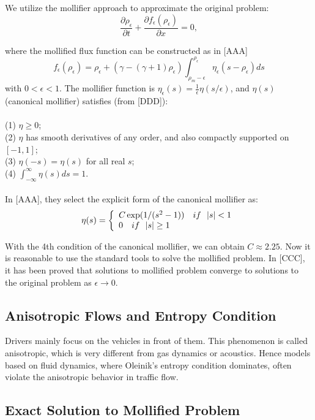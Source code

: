\documentclass[10pt]{article}
\newcommand{\e}{\epsilon}
\newcommand{\p}{\partial}
\begin{document}
We utilize the mollifier approach to approximate the original problem:
\[
\frac{\p \rho_\e}{\p t} + \frac{\p f_\e(\rho_\e)}{\p x} = 0,
\]

where the mollified flux function can be constructed as in [AAA]
\[
f_{\e}(\rho_{\e})=\rho_{\e}+(\gamma-(\gamma+1)\rho_{\e})\int_{\rho_m-\e}^{\rho_{\e}} \eta_\e(s-\rho_\e) ds
\]
with $0<\epsilon<1$. The mollifier function is $\eta_\e(s)=\frac{1}{\e}\eta(s/\e)$, and $\eta(s)$ (canonical mollifier) satisfies (from [DDD]):
\\\\
(1) $\eta\geq 0$;\\
(2) $\eta$ has smooth derivatives of any order, and also compactly supported on $[-1,1]$;\\
(3) $\eta(-s)=\eta(s)$ for all real $s$;\\
(4) $\int_{-\infty}^{\infty} \eta(s) ds=1$.
\\\\

In [AAA], they select the explicit form of the canonical mollifier as:
 \[\eta(s)=\left\{
  \begin{array}{l l}
    C\exp(1/(s^2-1)) \ \ \ if\ \ |s|<1\\
    0 \ \ \ if\ \ |s|\geq 1
  \end{array} \right.\]

  With the 4th condition of the canonical mollifier, we can obtain $C\approx 2.25$. Now it is reasonable to use the standard tools to solve the mollified problem.
  In [CCC], it has been proved that solutions to mollified problem converge to solutions to the original problem as $\e\rightarrow 0$.
\subsection{Anisotropic Flows and Entropy Condition}

Drivers mainly focus on the vehicles in front of them. This phenomenon is called anisotropic, which is very different from gas dynamics or acoustics. Hence models based on fluid dynamics, where Oleinik's entropy condition dominates, often violate the anisotropic behavior in traffic flow.

\subsection{Exact Solution to Mollified Problem}
\end{document}
